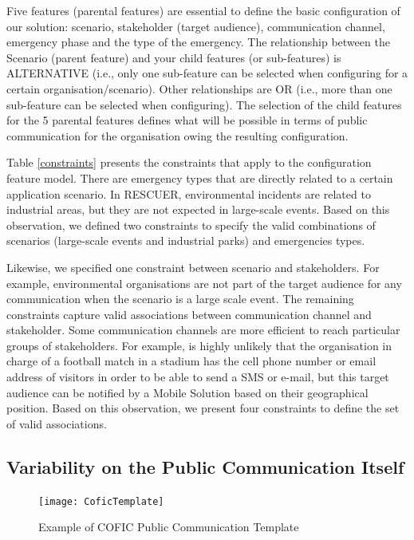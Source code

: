 Five features (parental features) are essential to define the basic configuration of our solution: scenario, stakeholder (target audience), communication channel, emergency phase and the type of the emergency. The relationship between the Scenario (parent feature) and your child features (or sub-features) is ALTERNATIVE (i.e., only one sub-feature can be selected when configuring for a certain organisation/scenario). Other relationships are OR (i.e., more than one sub-feature can be selected when configuring). The selection of the child features for the 5 parental features defines what will be possible in terms of public communication for the organisation owing the resulting configuration.



Table \ref{constraints} presents the constraints that apply to the configuration feature model. There are emergency types that are directly related to a certain application scenario. In RESCUER, environmental incidents are related to industrial areas, but they are not expected in large-scale events. Based on this observation, we defined two constraints to specify the valid combinations of scenarios (large-scale events and industrial parks) and emergencies types.

Likewise, we specified one constraint between scenario and stakeholders. For example, environmental organisations are not part of the target audience for any communication when the scenario is a large scale event.
The remaining constraints capture valid associations between communication channel and stakeholder. Some communication channels are more efficient to reach particular groups of stakeholders. For example, is highly unlikely that the organisation in charge of a football match in a stadium has the cell phone number or email address of visitors in order to be able to send a SMS or e-mail, but this target audience can be notified by a Mobile Solution based on their geographical position. Based on this observation, we present four constraints to define the set of valid associations.

\subsection*{Variability on the Public Communication Itself}

\begin{figure}[]
\centering
{
\texttt{[image: CoficTemplate]}
\label{model1}
}
\caption{Example of COFIC Public Communication Template}
\label{fig:templates}
\end{figure}


